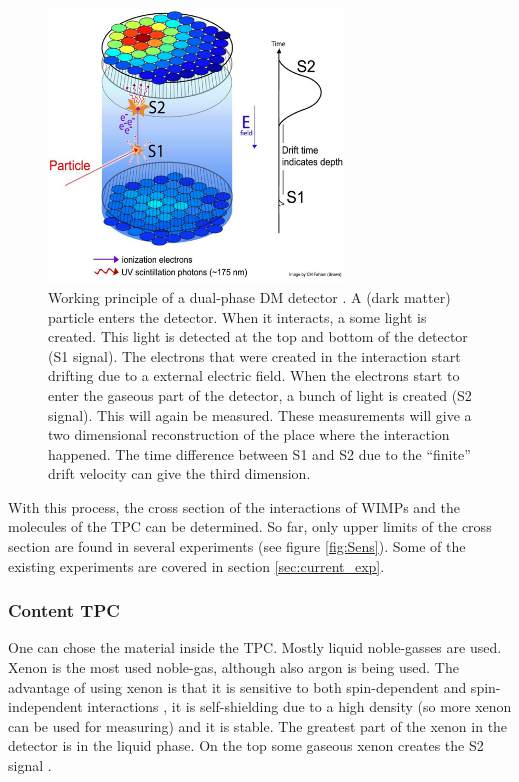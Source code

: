 \documentclass{article}
\begin{document}
\begin{figure}[h]
    \centering
    \includegraphics[width=0.7\textwidth]{Principle3.png}
    \caption{Working principle of a dual-phase DM detector \cite{Akerib:2015gmi}. A (dark matter) particle enters the detector. When it interacts, a some light is created. This light is detected at the top and bottom of the detector (S1 signal). The electrons that were created in the interaction start drifting due to a external electric field. When the electrons start to enter the gaseous part of the detector, a bunch of light is created (S2 signal). This will again be measured. These measurements will give a two dimensional reconstruction of the place where the interaction happened. The time difference between S1 and S2 due to the ``finite'' drift velocity can give the third dimension.}
    \label{fig:working}
\end{figure}

With this process, the cross section of the interactions of WIMPs and the molecules of the TPC can be determined. So far, only upper limits of the cross section are found in several experiments (see figure \ref{fig:Sens}).
Some of the existing experiments are covered in section \ref{sec:current_exp}.
\subsubsection{Content TPC}
One can chose the material inside the TPC. Mostly liquid noble-gasses are used. Xenon is the most used noble-gas, although also argon is being used. The advantage of using xenon is that it is sensitive to both spin-dependent and spin-independent interactions \cite{Aprile:2013doa}, it is self-shielding due to a high density (so more xenon can be used for measuring) \cite{Undagoitia:2015gya} and it is stable. The greatest part of the xenon in the detector is in the liquid phase. On the top some gaseous xenon creates the S2 signal \cite{Aprile:2009dv}.
\end{document}
